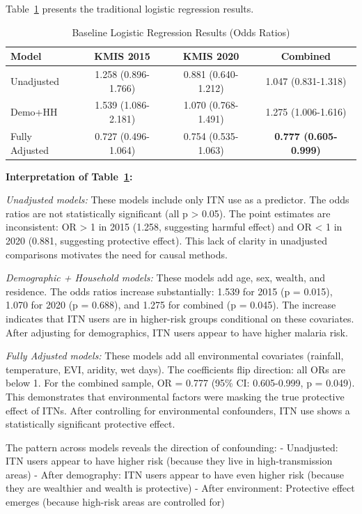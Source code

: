 Table~\ref{tab:baseline_ch4} presents the traditional logistic regression results.

\begin{table}[htbp]
	\centering
	\caption{Baseline Logistic Regression Results (Odds Ratios)}
	\label{tab:baseline_ch4}
	\begin{tabular}{@{}lccc@{}}
		\toprule
		\textbf{Model} & \textbf{KMIS 2015} & \textbf{KMIS 2020} & \textbf{Combined} \\
		\midrule
		Unadjusted & 1.258 (0.896-1.766) & 0.881 (0.640-1.212) & 1.047 (0.831-1.318) \\
		Demo+HH & 1.539 (1.086-2.181) & 1.070 (0.768-1.491) & 1.275 (1.006-1.616) \\
		Fully Adjusted & 0.727 (0.496-1.064) & 0.754 (0.535-1.063) & \textbf{0.777 (0.605-0.999)} \\
		\bottomrule
	\end{tabular}
\end{table}

\textbf{Interpretation of Table~\ref{tab:baseline_ch4}:}

\textit{Unadjusted models:} These models include only ITN use as a predictor. The odds ratios are not statistically significant (all p > 0.05). The point estimates are inconsistent: OR > 1 in 2015 (1.258, suggesting harmful effect) and OR < 1 in 2020 (0.881, suggesting protective effect). This lack of clarity in unadjusted comparisons motivates the need for causal methods.

\textit{Demographic + Household models:} These models add age, sex, wealth, and residence. The odds ratios increase substantially: 1.539 for 2015 (p = 0.015), 1.070 for 2020 (p = 0.688), and 1.275 for combined (p = 0.045). The increase indicates that ITN users are in higher-risk groups conditional on these covariates. After adjusting for demographics, ITN users appear to have higher malaria risk.

\textit{Fully Adjusted models:} These models add all environmental covariates (rainfall, temperature, EVI, aridity, wet days). The coefficients flip direction: all ORs are below 1. For the combined sample, OR = 0.777 (95\% CI: 0.605-0.999, p = 0.049). This demonstrates that environmental factors were masking the true protective effect of ITNs. After controlling for environmental confounders, ITN use shows a statistically significant protective effect.

The pattern across models reveals the direction of confounding:
- Unadjusted: ITN users appear to have higher risk (because they live in high-transmission areas)
- After demography: ITN users appear to have even higher risk (because they are wealthier and wealth is protective)
- After environment: Protective effect emerges (because high-risk areas are controlled for)

